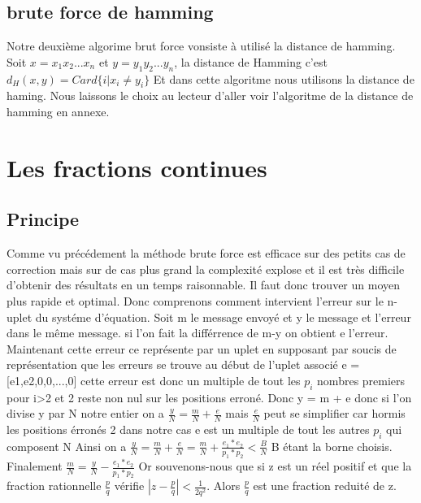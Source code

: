\documentclass[a4paper, 11pt]{article}
\begin{document}
\newpage
\subsection{brute force de hamming}

Notre deuxième algorime brut force vonsiste à utilisé la distance de hamming. Soit $x=x_1x_2 ... x_n$ et $y=y_1y_2 ... y_n$, la distance de Hamming c'est
$d_H(x,y)=Card\{  i\vert x_i \neq y_i \}$ \newline
Et dans cette algoritme nous utilisons la distance de haming. Nous laissons le choix au lecteur d'aller voir l'algoritme de la distance de hamming en annexe.


\newpage
\section{Les fractions continues} 
\subsection{Principe}
Comme vu précédement la méthode brute force est efficace sur des petits cas de correction mais sur de cas plus grand la complexité explose et il est très difficile d'obtenir des résultats en un temps raisonnable.\newline
Il faut donc trouver un moyen plus rapide et optimal. Donc comprenons comment intervient l'erreur sur le n-uplet du systéme d'équation.\newline
Soit m le message envoyé et y le message et l'erreur dans le même message. si l'on fait la différrence de m-y on obtient e l'erreur.
Maintenant cette erreur ce représente par un uplet en supposant par soucis de représentation que les erreurs se trouve au début de l'uplet associé
e = [e1,e2,0,0,...,0] cette erreur est donc un multiple de tout les $p_i$ nombres premiers pour i>2 et 2  reste non nul sur les positions erroné.\newline
Donc y = m + e donc si l'on divise y par N notre entier on a $\frac{y}{N}=\frac{m}{N}+\frac{e}{N}$\newline
mais $\frac{e}{N}$ peut se simplifier car hormis les positions érronés 2 dans notre cas e est un multiple de tout les autres $p_i$ qui composent N\newline
Ainsi on a  $\frac{y}{N}=\frac{m}{N}+\frac{e}{N}=\frac{m}{N}+ \frac{e_1 * e_2}{p_1 * p_2 } <\frac{B}{N} $    B étant la borne choisis.\newline
Finalement $\frac{m}{N}=\frac{y}{N} - \frac{e_1 * e_2}{p_1 * p_2 } $ \newline
\newline
Or souvenons-nous que si z est un réel positif et que la fraction rationnelle $\frac{p}{q}$
vérifie $ \left| z - \frac{p}{q} \right| < \frac{1}{2q^2} $. 
Alors $\frac{p}{q}$ est une fraction reduité de z.\newline
\newline
\end{document}

